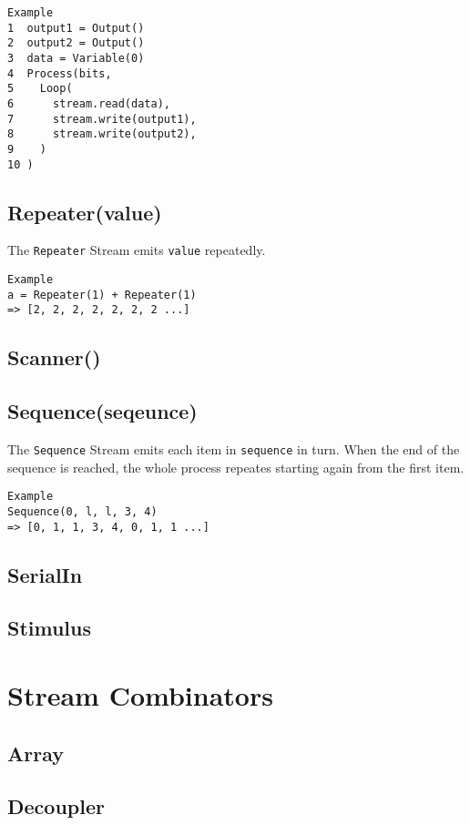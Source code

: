 \begin{verbatim}
Example
1  output1 = Output()
2  output2 = Output()
3  data = Variable(0)
4  Process(bits,
5    Loop(
6      stream.read(data),
7      stream.write(output1),
8      stream.write(output2),
9    )
10 )
\end{verbatim}

\label{Repeater}
\subsection{Repeater(value)}
The \verb|Repeater| Stream emits \verb|value| repeatedly.

\begin{verbatim}
Example
a = Repeater(1) + Repeater(1)
=> [2, 2, 2, 2, 2, 2, 2 ...]
\end{verbatim}

\subsection{Scanner()}

\subsection{Sequence(seqeunce)}
The \verb|Sequence| Stream emits each item in \verb|sequence| in turn. When the
end of the sequence is reached, the whole process repeates starting again from
the first item.

\begin{verbatim}
Example
Sequence(0, l, l, 3, 4)
=> [0, 1, 1, 3, 4, 0, 1, 1 ...]
\end{verbatim}

\subsection{SerialIn}
\subsection{Stimulus}

\section{Stream Combinators}
\subsection{Array}
\subsection{Decoupler}
